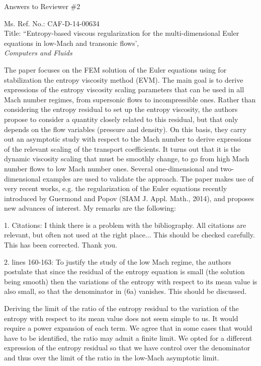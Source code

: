 \documentclass{article}
\begin{document}
\begin{center}
{ \Large Answers to Reviewer \#2}
\end{center}

\bigskip

\noindent Ms. Ref. No.: CAF-D-14-00634\\
Title: ``Entropy-based viscous regularization for the multi-dimensional Euler equations in low-Mach and transonic flows', \\
{\it Computers and Fluids}\\

\bigskip
\bigskip

{
\color{blue}
The paper focuses on the FEM solution of the Euler equations using for stabilization the entropy viscosity method (EVM). The main goal is to derive expressions of the entropy viscosity scaling parameters that can be used in all Mach number regimes, from supersonic flows to incompressible ones. Rather than considering the entropy residual to set up the entropy viscosity, the authors propose to consider a quantity closely related to this residual, but that only depends on the flow variables (pressure and density). On this basis, they carry out an asymptotic study with respect to the Mach number to derive expressions of the relevant scaling of the transport coefficients. It turns out that it is the dynamic viscosity scaling that must be smoothly change, to go  from high Mach number flows to low Mach number ones. Several one-dimensional and two-dimensional examples are used to validate the approach. The paper makes use of very recent works, e.g. the regularization
of the Euler equations recently introduced by Guermond and Popov  (SIAM J. Appl. Math., 2014), and proposes new advances of interest. My remarks are the following:
}

\bigskip

{
\color{blue}
1. Citations: I think there is a problem with the  bibliography. All citations are relevant, but often not used at the right place... This should be checked carefully.}
This has been corrected. Thank you.
\bigskip


{
\color{blue}
2. lines 160-163: To justify the study of the low Mach regime, the authors postulate that since the residual of the entropy equation is small (the solution being smooth) then the variations of the entropy with respect to its mean value is also small, so that the denominator in (6a) vanishes. This should be discussed.}

Deriving the limit of the ratio of the entropy residual to the variation of the entropy with respect to its mean value does not seem simple to us. It would require a power expansion of each term. We agree that in some cases that would have to be identified, the ratio may admit a finite limit. We opted for a different expression of the entropy residual so that we have control over the denominator and thus over the limit of the ratio in the low-Mach asymptotic limit. 
\bigskip
\end{document}

